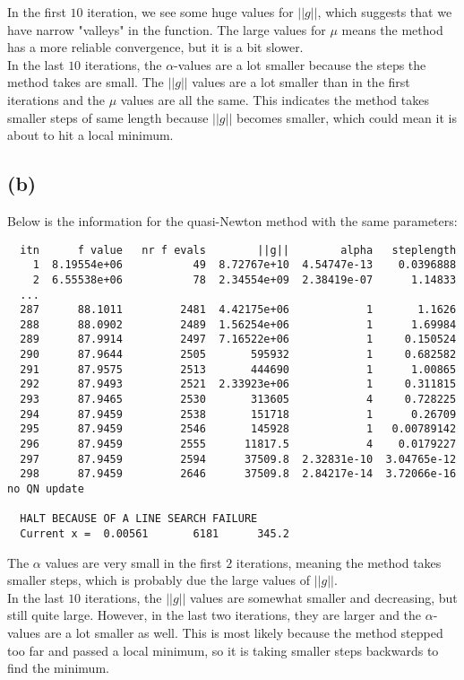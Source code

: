 \documentclass[a4paper, fleqn]{article}
\begin{document}
In the first $10$ iteration, we
see some huge values for $||g||$, which suggests that we have narrow "valleys" in
the function. The large values for $\mu$ means the method has a more reliable
convergence, but it is a bit slower. \\
In the last $10$ iterations, the $\alpha$-values are a lot smaller because the steps the
method takes are small. The $||g||$ values are a lot smaller than in the first iterations
and the $\mu$ values are all the same. This indicates the method takes smaller steps of
same length because $||g||$ becomes smaller, which could mean it is about to hit a local
minimum.

\subsection{(b)}
Below is the information for the quasi-Newton method with the same parameters:
\begin{verbatim}
  itn      f value   nr f evals        ||g||        alpha   steplength
    1  8.19554e+06           49  8.72767e+10  4.54747e-13    0.0396888
    2  6.55538e+06           78  2.34554e+09  2.38419e-07      1.14833
  ...
  287      88.1011         2481  4.42175e+06            1       1.1626
  288      88.0902         2489  1.56254e+06            1      1.69984
  289      87.9914         2497  7.16522e+06            1     0.150524
  290      87.9644         2505       595932            1     0.682582
  291      87.9575         2513       444690            1      1.00865
  292      87.9493         2521  2.33923e+06            1     0.311815
  293      87.9465         2530       313605            4     0.728225
  294      87.9459         2538       151718            1      0.26709
  295      87.9459         2546       145928            1   0.00789142
  296      87.9459         2555      11817.5            4    0.0179227
  297      87.9459         2594      37509.8  2.32831e-10  3.04765e-12
  298      87.9459         2646      37509.8  2.84217e-14  3.72066e-16 no QN update

  HALT BECAUSE OF A LINE SEARCH FAILURE
  Current x =  0.00561       6181      345.2
\end{verbatim}
The $\alpha$ values are very small in the first $2$ iterations, meaning the method takes
smaller steps, which is probably due the large values of $||g||$. \\
In the last $10$ iterations, the $||g||$ values are somewhat smaller and decreasing, but
still quite large. However, in the last two iterations, they are larger and the
$\alpha$-values are a lot smaller as well. This is most likely because the method stepped
too far and passed a local minimum, so it is taking smaller steps backwards to find the
minimum.
\end{document}
